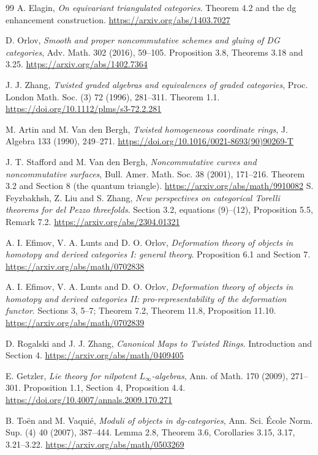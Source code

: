 \documentclass[a4paper,11pt]{ltjsarticle}
\theoremstyle{definition}
\begin{document}
\begin{thebibliography}{99}
A. Elagin,
\emph{On equivariant triangulated categories}.
Theorem 4.2 and the dg enhancement construction.
\url{https://arxiv.org/abs/1403.7027}

D. Orlov,
\emph{Smooth and proper noncommutative schemes and gluing of DG categories},
Adv. Math. 302 (2016), 59--105.
Proposition 3.8, Theorems 3.18 and 3.25.
\url{https://arxiv.org/abs/1402.7364}

J. J. Zhang,
\emph{Twisted graded algebras and equivalences of graded categories},
Proc. London Math. Soc. (3) 72 (1996), 281--311.
Theorem 1.1.
\url{https://doi.org/10.1112/plms/s3-72.2.281}

M. Artin and M. Van den Bergh,
\emph{Twisted homogeneous coordinate rings},
J. Algebra 133 (1990), 249--271.
\url{https://doi.org/10.1016/0021-8693(90)90269-T}

J. T. Stafford and M. Van den Bergh,
\emph{Noncommutative curves and noncommutative surfaces},
Bull. Amer. Math. Soc. 38 (2001), 171--216.
Theorem 3.2 and Section 8 (the quantum triangle).
\url{https://arxiv.org/abs/math/9910082}
S. Feyzbakhsh, Z. Liu and S. Zhang,
\emph{New perspectives on categorical Torelli theorems for del Pezzo threefolds}.
Section 3.2, equations (9)--(12), Proposition 5.5, Remark 7.2.
\url{https://arxiv.org/abs/2304.01321}

A. I. Efimov, V. A. Lunts and D. O. Orlov,
\emph{Deformation theory of objects in homotopy and derived categories I: general theory}.
Proposition 6.1 and Section 7.
\url{https://arxiv.org/abs/math/0702838}

A. I. Efimov, V. A. Lunts and D. O. Orlov,
\emph{Deformation theory of objects in homotopy and derived categories II:
pro-representability of the deformation functor}.
Sections 3, 5--7; Theorem 7.2, Theorem 11.8, Proposition 11.10.
\url{https://arxiv.org/abs/math/0702839}

D. Rogalski and J. J. Zhang,
\emph{Canonical Maps to Twisted Rings}.
Introduction and Section 4.
\url{https://arxiv.org/abs/math/0409405}

E. Getzler,
\emph{Lie theory for nilpotent $L_\infty$-algebras},
Ann. of Math. 170 (2009), 271--301.
Proposition 1.1, Section 4, Proposition 4.4.
\url{https://doi.org/10.4007/annals.2009.170.271}

B. To\"en and M. Vaqui\'e,
\emph{Moduli of objects in dg-categories},
Ann. Sci. \'Ecole Norm. Sup. (4) 40 (2007), 387--444.
Lemma 2.8, Theorem 3.6, Corollaries 3.15, 3.17, 3.21--3.22.
\url{https://arxiv.org/abs/math/0503269}


\end{thebibliography}
\end{document}
